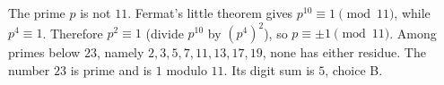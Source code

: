 The prime $p$ is not $11$. Fermat's little theorem gives $p^{10}\equiv1\pmod{11}$, while $p^4\equiv1$. Therefore $p^2\equiv1$ (divide $p^{10}$ by $(p^4)^2$), so $p\equiv\pm1\pmod{11}$. Among primes below $23$, namely $2,3,5,7,11,13,17,19$, none has either residue. The number $23$ is prime and is $1$ modulo $11$. Its digit sum is $\boxed5$, choice B.
